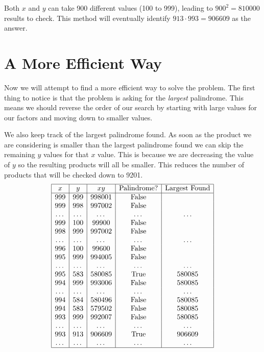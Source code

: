 \documentclass{article}
\begin{document}
Both \(x\) and \(y\) can take 900 different values (100 to 999), leading to \(900^2 = 810000\) results to check. This method will eventually identify \(913\cdot993=906609\) as the answer.

\section*{A More Efficient Way}
Now we will attempt to find a more efficient way to solve the problem. The first thing to notice is that the problem is asking for the \emph{largest} palindrome. This means we should reverse the order of our search by starting with large values for our factors and moving down to smaller values.

We also keep track of the largest palindrome found. As soon as the product we are considering is smaller than the largest palindrome found we can skip the remaining \(y\) values for that \(x\) value. This is because we are decreasing the value of \(y\) so the resulting products will all be smaller. This reduces the number of products that will be checked down to 9201.
\[\begin{array}{|c|c|c|c|c|}
    \hline
    x & y & xy & \text{Palindrome?} & \text{Largest Found} \\
    \hline
    999 & 999 & 998001 & \text{False} & \\
    999 & 998 & 997002 & \text{False} & \\
    \dots & \dots & \dots & \dots & \dots \\
    999 & 100 & 99900 & \text{False} & \\
    998 & 999 & 997002 & \text{False} & \\
    \dots & \dots & \dots & \dots & \dots \\
    996 & 100 & 99600 & \text{False} & \\
    995 & 999 & 994005 & \text{False} & \\
    \dots & \dots & \dots & \dots & \dots \\
    995 & 583 & 580085 & \text{True} & 580085 \\
    994 & 999 & 993006 & \text{False} & 580085 \\
    \dots & \dots & \dots & \dots & \dots \\
    994 & 584 & 580496 & \text{False} & 580085 \\
    994 & 583 & 579502 & \text{False} & 580085 \\
    993 & 999 & 992007 & \text{False} & 580085 \\
    \dots & \dots & \dots & \dots & \dots \\
    993 & 913 & 906609 & \text{True} & 906609 \\
    \dots & \dots & \dots & \dots & \dots \\
    \hline
\end{array}\]
\end{document}
